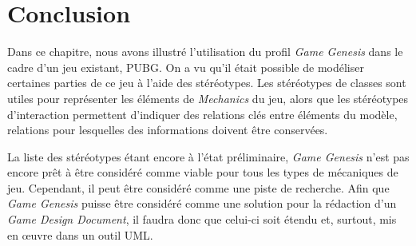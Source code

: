 \section{Conclusion}


Dans ce chapitre, nous avons illustré l'utilisation du profil \emph{Game Genesis} dans le cadre d'un jeu existant, PUBG.
On a vu qu'il était possible de modéliser certaines parties de ce jeu à l'aide des stéréotypes.
Les stéréotypes de classes sont utiles pour représenter les éléments de \emph{Mechanics} du jeu, alors
que
les stéréotypes d'interaction permettent d'indiquer des relations clés entre éléments du modèle, relations pour lesquelles des informations doivent être conservées.

La liste des stéréotypes étant encore à l'état préliminaire, \emph{Game Genesis} n'est pas encore prêt à être considéré comme viable pour tous les types de mécaniques de jeu. Cependant, il peut être considéré comme une piste de recherche.
Afin que \emph{Game Genesis} puisse être considéré comme une solution pour la rédaction d'un \emph{Game Design Document}, il faudra donc que celui-ci soit étendu et, surtout, mis en \oe{}uvre dans un outil UML.
